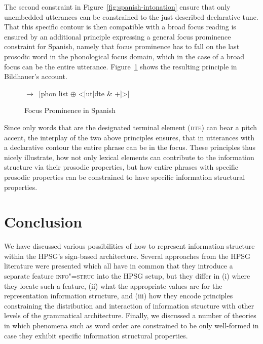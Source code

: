 \documentclass[output=paper]{langsci/langscibook}
\begin{document}
The second constraint in Figure~\ref{fig:spanish-intonation} ensure
that only unembedded utterances can be constrained to the just
described declarative tune. That this specific contour is then
compatible with a broad focus reading is ensured by an additional
principle expressing a general focus prominence constraint for
Spanish, namely that focus prominence has to fall on the last prosodic
word in the phonological focus domain, which in the case of a broad
focus can be the entire utterance. Figure~\ref{fig:focus-prominence}
shows the resulting principle in Bildhauer's account.
\begin{figure}[htp]
  \centering
  \begin{avm}
$\rightarrow$\
[phon list $\oplus$ <[ut|dte & +]>]
  \end{avm}
  \caption{Focus Prominence in Spanish}
  \label{fig:focus-prominence}
\end{figure}
Since only words
that are the designated terminal element (\textsc{dte}) can bear a
pitch accent, the interplay of the two above principles ensures, that
in utterances with a declarative contour the entire phrase can be in
the focus. These principles thus nicely illustrate, how not only
lexical elements can contribute to the information structure via their
prosodic properties, but how entire phrases with specific prosodic
properties can be constrained to have specific information structural
properties.

\section{Conclusion}
\label{sec:conclusion}

We have discussed various possibilities of how to represent
information structure within the HPSG's sign-based architecture.
Several approaches from the HPSG literature were presented which all
have in common that they introduce a separate feature
\textsc{info"=struc} into the HPSG setup, but they differ in (i) where
they locate such a feature, (ii) what the appropriate values are for
the representation information structure, and (iii) how they encode
principles constraining the distribution and interaction of
information structure with other levels of the grammatical
architecture. Finally, we discussed a number of theories in which
phenomena such as word order are constrained to be only well-formed in
case they exhibit specific information structural properties.



\printbibliography[heading=subbibliography,notkeyword=this] 
\end{document}

